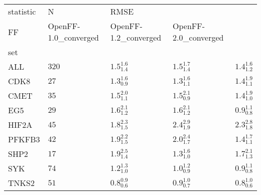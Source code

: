 \begin{tabular}{lllll}
\toprule
statistic &      N & \multicolumn{3}{l}{RMSE} \\
FF & OpenFF-1.0_converged & OpenFF-1.2_converged & OpenFF-2.0_converged \\
set    &        &                      &                      &                      \\
\midrule
ALL    &  $320$ &    $1.5_{1.4}^{1.6}$ &    $1.5_{1.4}^{1.7}$ &    $1.4_{1.2}^{1.6}$ \\
CDK8   &   $27$ &    $1.3_{0.9}^{1.6}$ &    $1.3_{1.1}^{1.6}$ &    $1.4_{1.1}^{1.9}$ \\
CMET   &   $35$ &    $1.5_{1.1}^{2.0}$ &    $1.5_{0.9}^{2.1}$ &    $1.4_{1.0}^{1.9}$ \\
EG5    &   $29$ &    $1.6_{1.2}^{2.1}$ &    $1.6_{1.2}^{2.1}$ &    $0.9_{0.8}^{1.1}$ \\
HIF2A  &   $45$ &    $1.8_{1.5}^{2.3}$ &    $2.4_{1.9}^{2.9}$ &    $2.3_{1.8}^{2.8}$ \\
PFKFB3 &   $42$ &    $1.9_{1.5}^{2.2}$ &    $2.0_{1.7}^{2.4}$ &    $1.4_{1.1}^{1.7}$ \\
SHP2   &   $17$ &    $1.9_{1.4}^{2.5}$ &    $1.3_{1.0}^{1.6}$ &    $1.7_{1.3}^{2.1}$ \\
SYK    &   $74$ &    $1.2_{1.0}^{1.3}$ &    $1.0_{0.9}^{1.2}$ &    $0.9_{0.8}^{1.1}$ \\
TNKS2  &   $51$ &    $0.8_{0.6}^{0.9}$ &    $0.9_{0.7}^{1.0}$ &    $0.8_{0.6}^{1.0}$ \\
\bottomrule
\end{tabular}
